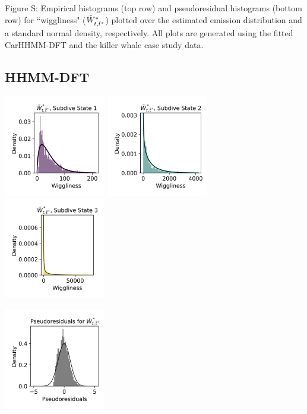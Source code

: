 \documentclass{article}
\begin{document}
        \noindent Figure S: Empirical histograms (top row) and pseudoresidual histograms (bottom row) for ``wiggliness" ($\tilde{W}^*_{t,\tilde t^*}$) plotted over the estimated emission distribution and a standard normal density, respectively. All plots are generated using the fitted CarHHMM-DFT and the killer whale case study data.
        \addtocounter{fignum}{1}
        
        \subsection{HHMM-DFT}
        
        \begin{center}
        \includegraphics[width=1.75in]{../Plots/2019/20190902-182840-CATs_OB_1_0_267_HHMM_empirical_hist_ahat_0.png}
        \includegraphics[width=1.75in]{../Plots/2019/20190902-182840-CATs_OB_1_0_267_HHMM_empirical_hist_ahat_1.png}
        \includegraphics[width=1.75in]{../Plots/2019/20190902-182840-CATs_OB_1_0_267_HHMM_empirical_hist_ahat_2.png}
        
        \includegraphics[width=1.75in]{../Plots/2019/20190902-182840-CATs_OB_1_0_267_HHMM_pseudresids_ahat.png}
        \end{center}
        
\end{document}
